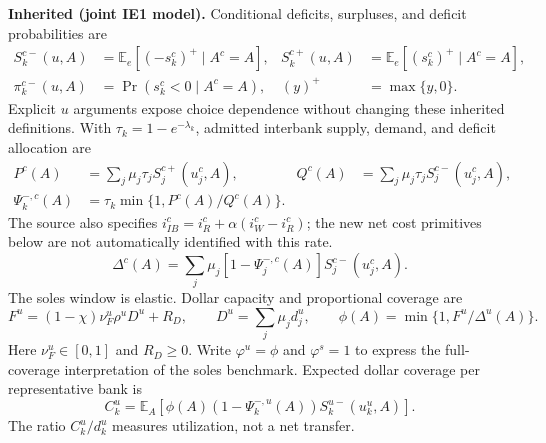 \documentclass[11pt,a4paper]{article}
\newcommand{\E}{\mathbb E}
\newcommand{\inh}{\textbf{Inherited (joint IE1 model).}}
\begin{document}
\inh{} Conditional deficits, surpluses, and deficit probabilities are
\begin{align}
 S_k^{c-}(u,A)&=\E_e[(-s_k^c)^+\mid A^c=A],&
 S_k^{c+}(u,A)&=\E_e[(s_k^c)^+\mid A^c=A],\\
 \pi_k^{c-}(u,A)&=\Pr(s_k^c<0\mid A^c=A),& (y)^+&=\max\{y,0\}.
\end{align}
Explicit $u$ arguments expose choice dependence without changing these inherited definitions. With $\tau_k=1-e^{-\lambda_k}$, admitted interbank supply, demand, and deficit allocation are
\begin{align}
 P^c(A)&=\sum_j\mu_j\tau_j S_j^{c+}(u_j^c,A),&
 Q^c(A)&=\sum_j\mu_j\tau_j S_j^{c-}(u_j^c,A),\\
 \Psi_k^{-,c}(A)&=\tau_k\min\{1,P^c(A)/Q^c(A)\}.
\end{align}
The source also specifies $i_{IB}^c=i_R^c+\alpha(i_W^c-i_R^c)$; the new net cost primitives below are not automatically identified with this rate.
\begin{equation}
 \Delta^c(A)=\sum_j\mu_j[1-\Psi_j^{-,c}(A)]S_j^{c-}(u_j^c,A).
\end{equation}
The soles window is elastic. Dollar capacity and proportional coverage are
\begin{equation}\label{eq:fund}
 F^u=(1-\chi)\nu_F^u\rho^uD^u+R_D,\qquad
 D^u=\sum_j\mu_jd_j^u,\qquad
 \phi(A)=\min\{1,F^u/\Delta^u(A)\}.
\end{equation}
Here $\nu_F^u\in[0,1]$ and $R_D\geq0$. Write $\varphi^u=\phi$ and $\varphi^s=1$ to express the full-coverage interpretation of the soles benchmark. Expected dollar coverage per representative bank is
\begin{equation}
 C_k^u=\E_A[\phi(A)(1-\Psi_k^{-,u}(A))S_k^{u-}(u_k^u,A)].
\end{equation}
The ratio $C_k^u/d_k^u$ measures utilization, not a net transfer.
\end{document}
